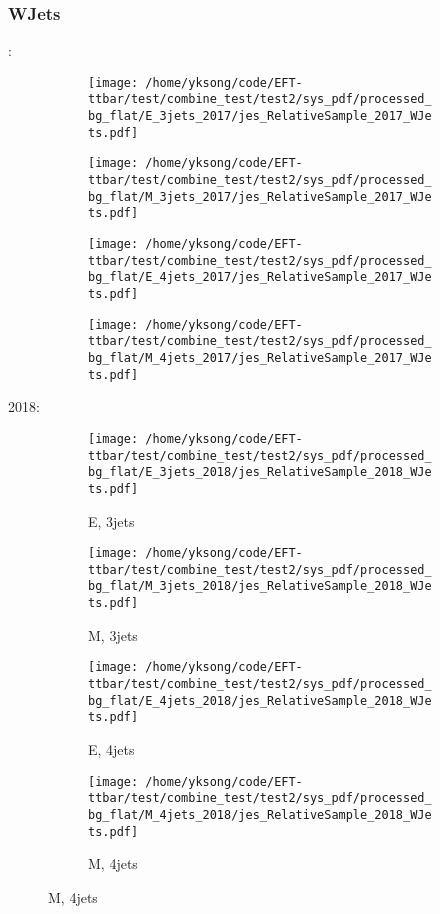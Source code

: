 \documentclass{beamer}
\begin{document}
\begin{frame}
\frametitle{WJets}
\fontsize{5}{1}:
\begin{figure}
\centering
\begin{subfigure}[b]{0.24\textwidth}
\texttt{[image: /home/yksong/code/EFT-ttbar/test/combine\_test/test2/sys\_pdf/processed\_bg\_flat/E\_3jets\_2017/jes\_RelativeSample\_2017\_WJets.pdf]}
\end{subfigure}
\begin{subfigure}[b]{0.24\textwidth}
\texttt{[image: /home/yksong/code/EFT-ttbar/test/combine\_test/test2/sys\_pdf/processed\_bg\_flat/M\_3jets\_2017/jes\_RelativeSample\_2017\_WJets.pdf]}
\end{subfigure}
\begin{subfigure}[b]{0.24\textwidth}
\texttt{[image: /home/yksong/code/EFT-ttbar/test/combine\_test/test2/sys\_pdf/processed\_bg\_flat/E\_4jets\_2017/jes\_RelativeSample\_2017\_WJets.pdf]}
\end{subfigure}
\begin{subfigure}[b]{0.24\textwidth}
\texttt{[image: /home/yksong/code/EFT-ttbar/test/combine\_test/test2/sys\_pdf/processed\_bg\_flat/M\_4jets\_2017/jes\_RelativeSample\_2017\_WJets.pdf]}
\end{subfigure}
\end{figure}
2018:
\begin{figure}
\centering
\begin{subfigure}[b]{0.24\textwidth}
\texttt{[image: /home/yksong/code/EFT-ttbar/test/combine\_test/test2/sys\_pdf/processed\_bg\_flat/E\_3jets\_2018/jes\_RelativeSample\_2018\_WJets.pdf]}
\captionsetup{font=tiny}
\caption{E, 3jets}
\end{subfigure}
\begin{subfigure}[b]{0.24\textwidth}
\texttt{[image: /home/yksong/code/EFT-ttbar/test/combine\_test/test2/sys\_pdf/processed\_bg\_flat/M\_3jets\_2018/jes\_RelativeSample\_2018\_WJets.pdf]}
\captionsetup{font=tiny}
\caption{M, 3jets}
\end{subfigure}
\begin{subfigure}[b]{0.24\textwidth}
\texttt{[image: /home/yksong/code/EFT-ttbar/test/combine\_test/test2/sys\_pdf/processed\_bg\_flat/E\_4jets\_2018/jes\_RelativeSample\_2018\_WJets.pdf]}
\captionsetup{font=tiny}
\caption{E, 4jets}
\end{subfigure}
\begin{subfigure}[b]{0.24\textwidth}
\texttt{[image: /home/yksong/code/EFT-ttbar/test/combine\_test/test2/sys\_pdf/processed\_bg\_flat/M\_4jets\_2018/jes\_RelativeSample\_2018\_WJets.pdf]}
\captionsetup{font=tiny}
\caption{M, 4jets}
\end{subfigure}
\end{figure}
\end{frame}
\end{document}

